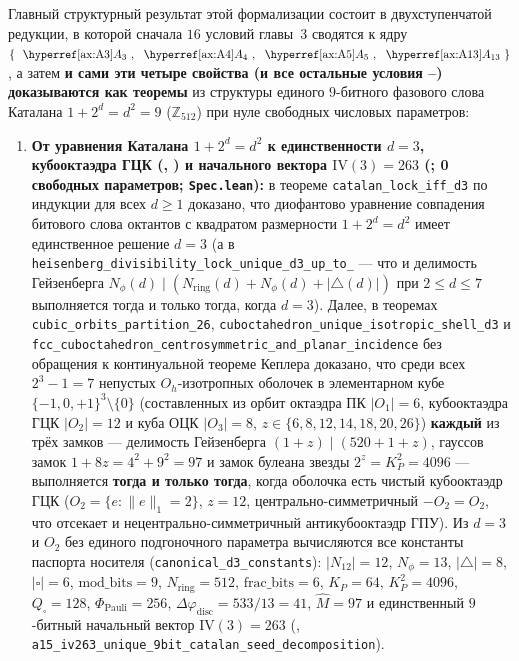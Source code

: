 Главный структурный результат этой формализации состоит в двухступенчатой редукции, в которой сначала $16$ условий главы~3 сводятся к ядру $\{\text{\Axref{ax:A3}}, \text{\Axref{ax:A4}}, \text{\Axref{ax:A5}}, \text{\Axref{ax:A13}}\}$, а затем \textbf{и сами эти четыре свойства (и все остальные условия --) доказываются как теоремы} из структуры единого $9$-битного фазового слова Каталана $1+2^d=d^2=9$ ($\mathbb{Z}_{512}$) при нуле свободных числовых параметров:
\begin{enumerate}[nosep,leftmargin=*]
\item \textbf{От уравнения Каталана $1+2^d=d^2$ к единственности $d=3$, кубооктаэдра ГЦК (, ) и начального вектора $\mathrm{IV}(3)=263$ (; 0 свободных параметров; \texttt{Spec.lean}):}
  в теореме \texttt{catalan\_lock\_iff\_d3} по индукции для всех $d\ge 1$ доказано, что диофантово уравнение совпадения битового слова октантов с квадратом размерности $1+2^d=d^2$ имеет единственное решение $d=3$ (а в \texttt{heisenberg\_\allowbreak divisibility\_\allowbreak lock\_\allowbreak unique\_\allowbreak d3\_\allowbreak up\_\allowbreak to\_} --- что и делимость Гейзенберга $N_\phi(d)\mid(N_{\mathrm{ring}}(d)+N_\phi(d)+|\triangle(d)|)$ при $2\le d\le 7$ выполняется тогда и только тогда, когда $d=3$). Далее, в теоремах \texttt{cubic\_orbits\_partition\_26}, \texttt{cuboctahedron\_\allowbreak unique\_\allowbreak isotropic\_\allowbreak shell\_\allowbreak d3} и \texttt{fcc\_\allowbreak cuboctahedron\_\allowbreak centrosymmetric\_\allowbreak and\_\allowbreak planar\_\allowbreak incidence} без обращения к континуальной теореме Кеплера доказано, что среди всех $2^3-1=7$ непустых $O_h$-изотропных оболочек в элементарном кубе $\{-1,0,+1\}^3\setminus\{0\}$ (составленных из орбит октаэдра ПК $|O_1|=6$, кубооктаэдра ГЦК $|O_2|=12$ и куба ОЦК $|O_3|=8$, $z\in\{6,8,12,14,18,20,26\}$) \textbf{каждый} из трёх замков --- делимость Гейзенберга $(1+z)\mid(520+1+z)$, гауссов замок $1+8z=4^2+9^2=97$ и замок булеана звезды $2^z=K_P^2=4096$ --- выполняется \textbf{тогда и только тогда}, когда оболочка есть чистый кубооктаэдр ГЦК ($O_2 = \{e:\|e\|_1=2\}$, $z=12$, центрально-симметричный $-O_2=O_2$, что отсекает и нецентрально-симметричный антикубооктаэдр ГПУ). Из $d=3$ и $O_2$ без единого подгоночного параметра вычисляются все константы паспорта носителя (\texttt{canonical\_d3\_constants}): $|N_{12}|=12$, $N_\phi=13$, $|\triangle|=8$, $|\square|=6$, $\mathrm{mod\_bits}=9$, $N_{\mathrm{ring}}=512$, $\mathrm{frac\_bits}=6$, $K_P=64$, $K_P^2=4096$, $Q_\square=128$, $\Phi_{\mathrm{Pauli}}=256$, $\Delta\varphi_{\mathrm{disc}}=533/13=41$, $\widehat{M}=97$ и единственный $9$-битный начальный вектор $\mathrm{IV}(3)=263$ (, \texttt{a15\_\allowbreak iv263\_\allowbreak unique\_\allowbreak 9bit\_\allowbreak catalan\_\allowbreak seed\_\allowbreak decomposition}).

\end{enumerate}

